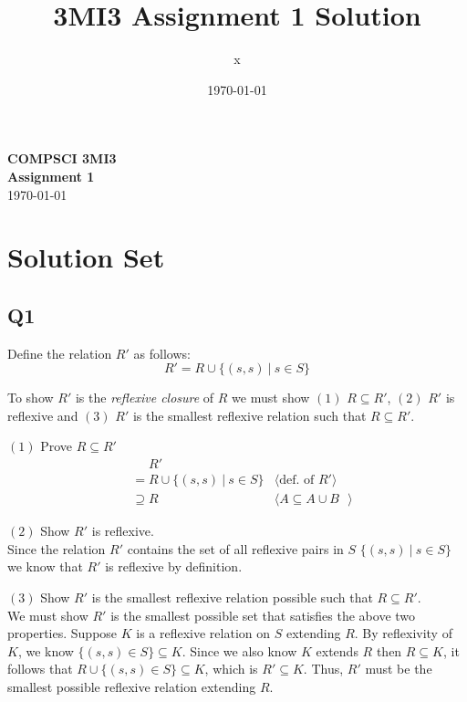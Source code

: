 \documentclass[12pt, fleqn]{article}
\title{3MI3 Assignment 1 Solution}
\author{x}
\date{\today}
\newcommand{\pnote}[1]{{\langle \text{#1} \rangle}}
\begin{document}
\begin{center}

    {\large \textbf{COMPSCI 3MI3}}\\[8mm]
    {\huge \textbf{Assignment 1}}\\[6mm]
    {\large \today}
  
\end{center}

\medskip

\section{Solution Set}

\subsection{Q1}

Define the relation $R'$ as follows:
$$R' = R \cup \{(s,s)~|~s \in S\}$$

\noindent
To show $R'$ is the \emph{reflexive closure} of $R$ we must show $(1)$ $R \subseteq R'$, $(2)$ $R'$ 
is reflexive and $(3)$ $R'$ is the smallest reflexive relation such that $R \subseteq R'$.

\medskip

$(1)$ Prove $R \subseteq R'$
\begin{align*}
    &\phantom{{}=} R' & \\
    &= R \cup \{ (s, s)~|~s \in S\} & \pnote{def. of $R'$} \\
    & \supseteq R & \pnote{$A \subseteq A \cup B$ }
\end{align*}

$(2)$ Show $R'$ is reflexive.\\
Since the relation $R'$ contains the set of all reflexive pairs in $S$
$\{ (s, s) ~|~ s \in S \}$ we know that $R'$ is reflexive by definition. 

\medskip

$(3)$ Show $R'$ is the smallest reflexive relation possible such that $R \subseteq R'$.\\
We must show $R'$ is the smallest possible set that satisfies the above two properties. 
Suppose $K$ is a reflexive relation on $S$ extending $R$. By reflexivity of $K$, we know $\{ (s, s) \in S \} \subseteq K$. 
Since we also know $K$ extends $R$ then $R \subseteq K$, it follows that $R \cup \{ (s, s) \in S \} \subseteq K$, which is $R' \subseteq K$. Thus, $R'$ must be the smallest possible reflexive relation extending $R$.
\end{document}
